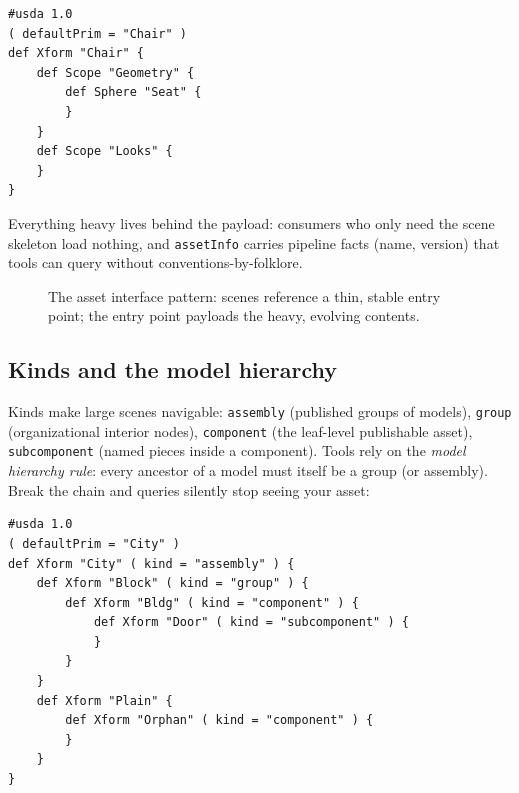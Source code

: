 \begin{lstlisting}
#usda 1.0
( defaultPrim = "Chair" )
def Xform "Chair" {
    def Scope "Geometry" {
        def Sphere "Seat" {
        }
    }
    def Scope "Looks" {
    }
}
\end{lstlisting}

\noindent{}Everything heavy lives behind the payload: consumers
who only need the scene skeleton load nothing, and
\texttt{assetInfo} carries pipeline facts (name, version)
that tools can query without conventions-by-folklore.

\begin{figure}[ht]
  \centering
  \caption{The asset interface pattern: scenes reference a thin, stable entry
  point; the entry point payloads the heavy, evolving contents.}
  \label{fig:asset-iface}
\end{figure}

\subsection{Kinds and the model hierarchy}\label{sec:pd-kinds}
Kinds make large scenes navigable:
\texttt{assembly} (published groups of models), \texttt{group} (organizational
interior nodes), \texttt{component} (the leaf-level publishable asset),
\texttt{subcomponent} (named pieces inside a component). Tools rely on the
\emph{model hierarchy rule}: every ancestor of a model must itself be a group
(or assembly). Break the chain and queries silently stop seeing your asset:

\begin{lstlisting}
#usda 1.0
( defaultPrim = "City" )
def Xform "City" ( kind = "assembly" ) {
    def Xform "Block" ( kind = "group" ) {
        def Xform "Bldg" ( kind = "component" ) {
            def Xform "Door" ( kind = "subcomponent" ) {
            }
        }
    }
    def Xform "Plain" {
        def Xform "Orphan" ( kind = "component" ) {
        }
    }
}
\end{lstlisting}

